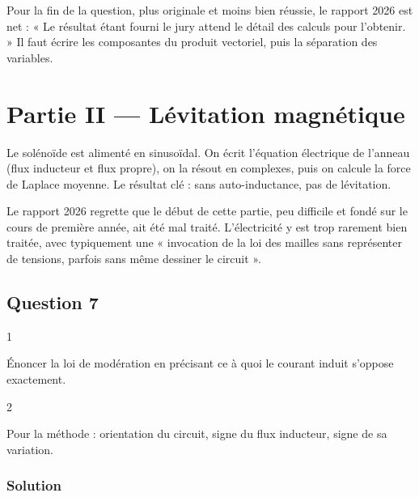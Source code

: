\documentclass[11pt,a4paper]{article}
\begin{document}
\begin{jury}

Pour la fin de la question, plus originale et moins bien réussie, le rapport 2026 est net : « Le résultat étant fourni le jury attend le détail des calculs pour l'obtenir. » Il faut écrire les composantes du produit vectoriel, puis la séparation des variables.

\end{jury}

\hypertarget{partie-ii-luxe9vitation-magnuxe9tique}{%
\section{Partie II --- Lévitation magnétique}\label{partie-ii-luxe9vitation-magnuxe9tique}}

Le solénoïde est alimenté en sinusoïdal. On écrit l'équation électrique de l'anneau (flux inducteur et flux propre), on la résout en complexes, puis on calcule la force de Laplace moyenne. Le résultat clé : sans auto-inductance, pas de lévitation.

\begin{jury}

Le rapport 2026 regrette que le début de cette partie, peu difficile et fondé sur le cours de première année, ait été mal traité. L'électricité y est trop rarement bien traitée, avec typiquement une « invocation de la loi des mailles sans représenter de tensions, parfois sans même dessiner le circuit ».

\end{jury}

\hypertarget{question-7}{%
\subsection{Question 7}\label{question-7}}

\begin{indication}{1}

Énoncer la loi de modération en précisant ce à quoi le courant induit s'oppose exactement.

\end{indication}

\begin{indication}{2}

Pour la méthode : orientation du circuit, signe du flux inducteur, signe de sa variation.

\end{indication}

\hypertarget{solution-6}{%
\subsubsection{Solution}\label{solution-6}}
\end{document}
